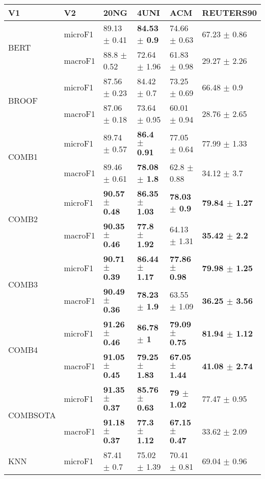\documentclass[]{article}
\begin{document}
\begin{table}[ht]
\centering
\begin{tabular}{llllll}
  \hline
V1 & V2 & 20NG & 4UNI & ACM & REUTERS90 \\ 
  \cline{3-6} \hline
\multirow{2}{*}{BERT} & microF1 & 89.13 $\pm$  0.41 & \bf{84.53 $\pm$  0.9} & 74.66 $\pm$  0.63 & 67.23 $\pm$  0.86 \\ 
   & macroF1 & 88.8 $\pm$  0.52 & 72.64 $\pm$  1.96 & 61.83 $\pm$  0.98 & 29.27 $\pm$  2.26 \\ 
   \cline{3-6}\multirow{2}{*}{BROOF} & microF1 & 87.56 $\pm$  0.23 & 84.42 $\pm$  0.7 & 73.25 $\pm$  0.69 & 66.48 $\pm$  0.9 \\ 
   & macroF1 & 87.06 $\pm$  0.18 & 73.64 $\pm$  0.95 & 60.01 $\pm$  0.94 & 28.76 $\pm$  2.65 \\ 
   \cline{3-6}\multirow{2}{*}{COMB1} & microF1 & 89.74 $\pm$  0.57 & \bf{86.4 $\pm$  0.91} & 77.05 $\pm$  0.64 & 77.99 $\pm$  1.33 \\ 
   & macroF1 & 89.46 $\pm$  0.61 & \bf{78.08 $\pm$  1.8} & 62.8 $\pm$  0.88 & 34.12 $\pm$  3.7 \\ 
   \cline{3-6}\multirow{2}{*}{COMB2} & microF1 & \bf{90.57 $\pm$  0.48} & \bf{86.35 $\pm$  1.03} & \bf{78.03 $\pm$  0.9} & \bf{79.84 $\pm$  1.27} \\ 
   & macroF1 & \bf{90.35 $\pm$  0.46} & \bf{77.8 $\pm$  1.92} & 64.13 $\pm$  1.31 & \bf{35.42 $\pm$  2.2} \\ 
   \cline{3-6}\multirow{2}{*}{COMB3} & microF1 & \bf{90.71 $\pm$  0.39} & \bf{86.44 $\pm$  1.17} & \bf{77.86 $\pm$  0.98} & \bf{79.98 $\pm$  1.25} \\ 
   & macroF1 & \bf{90.49 $\pm$  0.36} & \bf{78.23 $\pm$  1.9} & 63.55 $\pm$  1.09 & \bf{36.25 $\pm$  3.56} \\ 
   \cline{3-6}\multirow{2}{*}{COMB4} & microF1 & \bf{91.26 $\pm$  0.46} & \bf{86.78 $\pm$  1} & \bf{79.09 $\pm$  0.75} & \bf{81.94 $\pm$  1.12} \\ 
   & macroF1 & \bf{91.05 $\pm$  0.45} & \bf{79.25 $\pm$  1.83} & \bf{67.05 $\pm$  1.44} & \bf{41.08 $\pm$  2.74} \\ 
   \cline{3-6}\multirow{2}{*}{COMBSOTA} & microF1 & \bf{91.35 $\pm$  0.37} & \bf{85.76 $\pm$  0.63} & \bf{79 $\pm$  1.02} & 77.47 $\pm$  0.95 \\ 
   & macroF1 & \bf{91.18 $\pm$  0.37} & \bf{77.3 $\pm$  1.12} & \bf{67.15 $\pm$  0.47} & 33.62 $\pm$  2.09 \\ 
   \cline{3-6}\multirow{2}{*}{KNN} & microF1 & 87.41 $\pm$  0.7 & 75.02 $\pm$  1.39 & 70.41 $\pm$  0.81 & 69.04 $\pm$  0.96 \\ 

\end{tabular}
\end{table}
\end{document}
